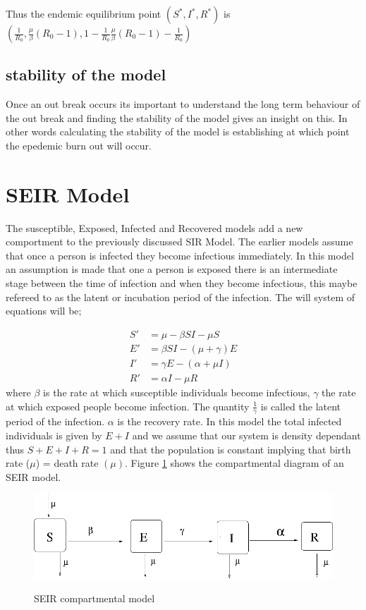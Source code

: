  Thus the endemic equilibrium point $( S^*,I^*,R^*)$ is 
 $\left( \frac{1}{R_0}, \frac{\mu}{\beta} (R_0 -1), 1 -  \frac{1}{R_0} \frac{\mu}{\beta} (R_0 -1) - \frac{1}{R_0} \right)$
 
 
  \subsection{stability of the model}
 Once an out break occurs its important to understand the long term behaviour of the out break and finding the stability of the model gives an insight on this. In other words calculating the stability of the model is establishing at which point the epedemic burn out will occur.
 \section{SEIR Model}
The susceptible, Exposed, Infected and Recovered models add a new comportment to the previously discussed SIR Model. The earlier models assume that once a person is infected they become infectious immediately. In this model an assumption is made that one a person is exposed there is an intermediate stage between the time of infection and when they become infectious, this maybe refereed  to as the latent  or incubation period of the infection.  The will system of equations will be;

\begin{align}
S'& = \mu -\beta S I - \mu S \label{5} \\
E' &= \beta S I - (\mu + \gamma) E  \label{6}\\
I' &= \gamma E - (\alpha + \mu I) \label{7}\\
R' &= \alpha I  - \mu R \label{8}
\end{align}
where $\beta$ is the rate at which susceptible individuals become infectious, $\gamma$ the rate at which exposed people become infection. The quantity $\frac{1}{\gamma}$ is called the latent period of the  infection. $\alpha$ is the recovery rate.
In this model the total infected individuals is given by $E +I$ and  we assume that our system is density dependant thus $S + E + I + R = 1$ and  that the population is constant implying that birth rate ($\mu$)  = death rate $(\mu)$. Figure \ref{fig 4.2} shows the compartmental diagram of an SEIR model.
\begin{figure}[h!]
 \caption{SEIR compartmental model}
 \centering
 \includegraphics[scale=0.5]{images/seir.png}\label{fig 4.2}
 \end{figure}
  
